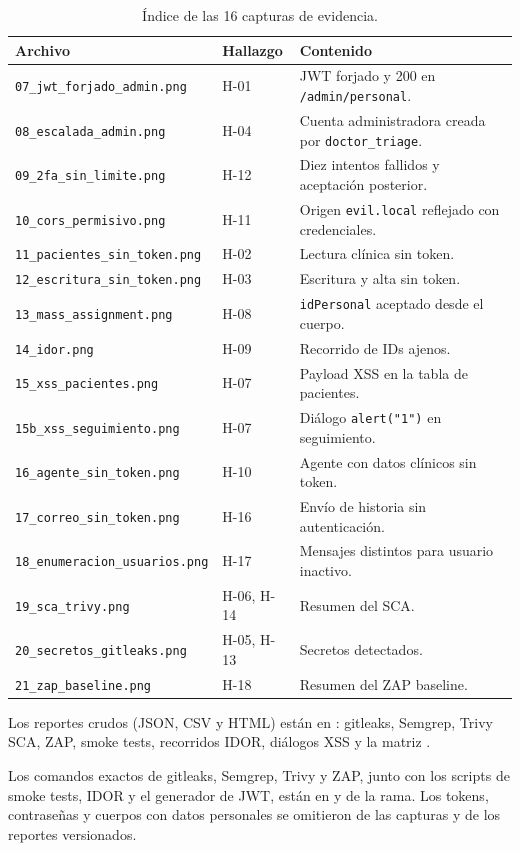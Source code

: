 \begin{table}[htbp]
\centering
\caption{Índice de las 16 capturas de evidencia.}
\label{tab:evidencias}
\small
\setlength{\tabcolsep}{2pt}
\begin{tabular}{@{}L{5.4cm}L{2.2cm}L{7.4cm}@{}}
\toprule
\textbf{Archivo} & \textbf{Hallazgo} & \textbf{Contenido}\\
\midrule
\texttt{07\_jwt\_forjado\_admin.png} & H-01 & JWT forjado y 200 en \texttt{/admin/personal}.\\
\texttt{08\_escalada\_admin.png} & H-04 & Cuenta administradora creada por \texttt{doctor\_triage}.\\
\texttt{09\_2fa\_sin\_limite.png} & H-12 & Diez intentos fallidos y aceptación posterior.\\
\texttt{10\_cors\_permisivo.png} & H-11 & Origen \texttt{evil.local} reflejado con credenciales.\\
\texttt{11\_pacientes\_sin\_token.png} & H-02 & Lectura clínica sin token.\\
\texttt{12\_escritura\_sin\_token.png} & H-03 & Escritura y alta sin token.\\
\texttt{13\_mass\_assignment.png} & H-08 & \texttt{idPersonal} aceptado desde el cuerpo.\\
\texttt{14\_idor.png} & H-09 & Recorrido de IDs ajenos.\\
\texttt{15\_xss\_pacientes.png} & H-07 & Payload XSS en la tabla de pacientes.\\
\texttt{15b\_xss\_seguimiento.png} & H-07 & Diálogo \texttt{alert("1")} en seguimiento.\\
\texttt{16\_agente\_sin\_token.png} & H-10 & Agente con datos clínicos sin token.\\
\texttt{17\_correo\_sin\_token.png} & H-16 & Envío de historia sin autenticación.\\
\texttt{18\_enumeracion\_usuarios.png} & H-17 & Mensajes distintos para usuario inactivo.\\
\texttt{19\_sca\_trivy.png} & H-06, H-14 & Resumen del SCA.\\
\texttt{20\_secretos\_gitleaks.png} & H-05, H-13 & Secretos detectados.\\
\texttt{21\_zap\_baseline.png} & H-18 & Resumen del ZAP baseline.\\
\bottomrule
\end{tabular}
\end{table}

Los reportes crudos (JSON, CSV y HTML) están en :
gitleaks, Semgrep, Trivy SCA, ZAP, smoke tests, recorridos IDOR, diálogos XSS y la
matriz .

Los comandos exactos de gitleaks, Semgrep, Trivy y ZAP, junto con los scripts de
smoke tests, IDOR y el generador de JWT, están en  y
 de la rama. Los tokens, contraseñas y cuerpos con
datos personales se omitieron de las capturas y de los reportes versionados.

